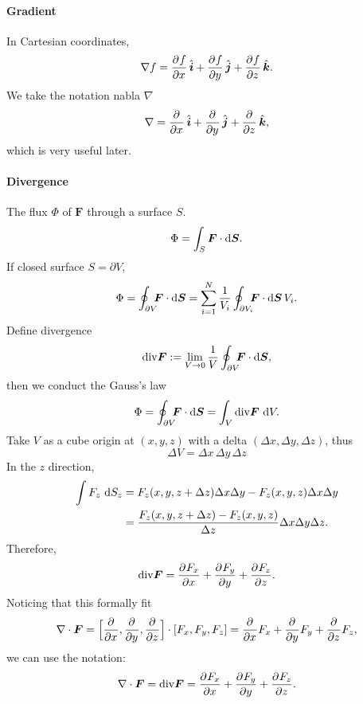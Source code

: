 \documentclass{article}
\newcommand{\ko}[1]{\hspace{-#1 pt}}
\begin{document}
\paragraph{Gradient} In Cartesian coordinates,
$$\nabla f=\frac{\partial^{}f}{\partial{x}^{}}\mathop{}\!\hat{\bm{i}}+\frac{\partial^{}f}{\partial{y}^{}}\mathop{}\!\hat{\bm{j}}+\frac{\partial^{}f}{\partial{z}^{}}\mathop{}\!\hat{\bm{k}}.$$
We take the notation nabla $\nabla$
$$\nabla=\frac{\partial^{}}{\partial{x}^{}}\mathop{}\!\hat{\bm{i}}+\frac{\partial^{}}{\partial{y}^{}}\mathop{}\!\hat{\bm{j}}+\frac{\partial^{}}{\partial{z}^{}}\mathop{}\!\hat{\bm{k}},$$
which is very useful later.
\paragraph{Divergence} The flux $\Phi$ of $\bm F$ through a surface $S$.
$$\Phi=\int_S\bm F\cdot\mathop{}\!\mathrm{d}\bm S.$$
If closed surface $S=\partial V$,
$$\Phi=\oint_{\partial V}\ko5\bm F\cdot\d\bm S=\sum_{i=1}^N\frac1{V_i}\oint_{\partial V_i}\ko5\bm F\cdot\d\bm S\,V_i.$$
Define divergence
$$\text{div}\bm F:=\lim_{V\to0}\frac1V\oint_{\partial V}\ko5\bm F\cdot\d\bm S,$$
then we conduct the Gauss's law
$$\Phi=\oint_{\partial V}\ko5\bm F\cdot\d\bm S=\int_V\text{div}\bm F\,\d V.$$
Take $V$ as a cube origin at $(x,y,z)$ with a delta $(\Delta x,\Delta y,\Delta z)$, thus
$$\Delta V=\Delta x\,\Delta y\,\Delta z$$
In the $z$ direction,
\begin{align*}
	\int F_z\,\mathop{}\!\mathrm{d} S_z & = F_z(x,y,z+\Delta z)\Delta x\Delta y- F_z(x,y,z)\Delta x\Delta y           \\
	                 & =\frac{ F_z(x,y,z+\Delta z)- F_z(x,y,z)}{\Delta z}\Delta x\Delta y\Delta z.
\end{align*}
Therefore,
$$\text{div}\bm F=\frac{\partial^{} F_x}{\partial{x}^{}}+\frac{\partial^{} F_y}{\partial{y}^{}}+\frac{\partial^{} F_z}{\partial{z}^{}}.$$
Noticing that this formally fit
$$\nabla\cdot\bm F=\Bigl[\frac{\partial^{}}{\partial{x}^{}},\frac{\partial^{}}{\partial{y}^{}},\frac{\partial^{}}{\partial{z}^{}}\Bigr]\cdot[F_x, F_y, F_z]=\frac{\partial^{}}{\partial{x}^{}} F_x+\frac{\partial^{}}{\partial{y}^{}} F_y+\frac{\partial^{}}{\partial{z}^{}} F_z,$$
we can use the notation:
$$\nabla\cdot\bm F=\text{div}\bm F=\frac{\partial^{} F_x}{\partial{x}^{}}+\frac{\partial^{} F_y}{\partial{y}^{}}+\frac{\partial^{} F_z}{\partial{z}^{}}.$$
\end{document}
